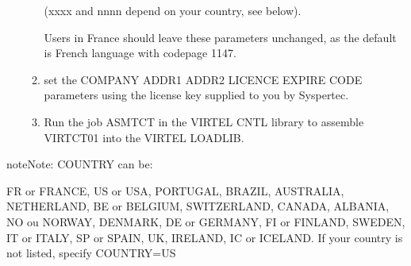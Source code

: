 \documentclass[letterpaper,10pt,english]{sphinxmanual}
\begin{document}
\begin{enumerate}
\begin{enumerate}
\begin{sphinxVerbatim}[commandchars=\\\{\}]
                                               
                                           
                                        
\end{sphinxVerbatim}

(xxxx and nnnn depend on your country, see below).

Users in France should leave these parameters unchanged, as the
default is French language with codepage 1147.

\item {} 
set the COMPANY ADDR1 ADDR2 LICENCE EXPIRE CODE parameters using
the license key supplied to you by Syspertec.

\item {} 
Run the job ASMTCT in the VIRTEL CNTL library to assemble VIRTCT01
into the VIRTEL LOADLIB.

\end{enumerate}

\end{enumerate}

\begin{sphinxadmonition}{note}{Note:}
COUNTRY can be:

FR or FRANCE, US or USA, PORTUGAL, BRAZIL, AUSTRALIA,
NETHERLAND, BE or BELGIUM, SWITZERLAND, CANADA, ALBANIA,
NO ou NORWAY, DENMARK, DE or GERMANY, FI or FINLAND,
SWEDEN, IT or ITALY, SP or SPAIN, UK, IRELAND, IC or ICELAND.
If your country is not listed, specify COUNTRY=US
\end{sphinxadmonition}
\end{document}
